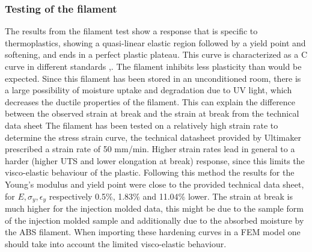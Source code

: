 \subsubsection{Testing of the filament}
The results from the filament test show a response that is specific to thermoplastics, showing a quasi-linear elastic region followed by a yield point and softening, and ends in a perfect plastic plateau. This curve is characterized as a C curve in different standards \cite{Afd2016NEN-EN-ISO527-2},\cite{Fahrenholz2018TheZwick/Roell}. The filament inhibits less plasticity than would be expected\cite{Rodriguez2001MechanicalInvestigation}. Since this filament has been stored in an unconditioned room, there is a large possibility of moisture uptake and degradation due to UV light, which decreases the ductile properties of the filament\cite{Turner2014AModeling}. This can explain the difference between the observed strain at break and the strain at break from the technical data sheet \cite{Ultimaker2018TechnicalABS}
The filament has been tested on a relatively high strain rate to determine the stress strain curve, the technical datasheet provided by Ultimaker prescribed a strain rate of 50 mm/min. Higher strain rates lead in general to a harder (higher UTS and lower elongation at break) response, since this limits the visco-elastic behaviour of the plastic. Following this method the results for the Young's modulus and yield point were close to the provided technical data sheet, for $E, \sigma_y, \epsilon_y$ respectively 0.5\%, 1.83\% and 11.04\% lower. The strain at break is much higher for the injection molded data, this might be due to the sample form of the injection molded sample and additionally due to the absorbed moisture by the ABS filament.  
When importing these hardening curves in a FEM model one should take into account the limited visco-elastic behaviour. 

